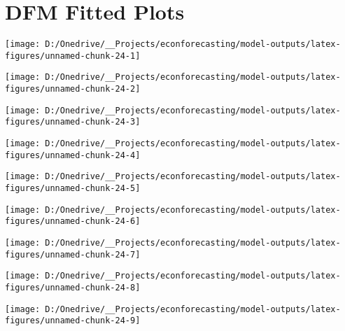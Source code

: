 \documentclass[11pt, letterpaper]{article}\usepackage[]{graphicx}\usepackage[]{color}
\begin{document}
\appendix
\appendixpage
\addappheadtotoc

\section{DFM Fitted Plots}


{\centering \texttt{[image: D:/Onedrive/\_\_Projects/econforecasting/model-outputs/latex-figures/unnamed-chunk-24-1]} 

}




{\centering \texttt{[image: D:/Onedrive/\_\_Projects/econforecasting/model-outputs/latex-figures/unnamed-chunk-24-2]} 

}




{\centering \texttt{[image: D:/Onedrive/\_\_Projects/econforecasting/model-outputs/latex-figures/unnamed-chunk-24-3]} 

}




{\centering \texttt{[image: D:/Onedrive/\_\_Projects/econforecasting/model-outputs/latex-figures/unnamed-chunk-24-4]} 

}




{\centering \texttt{[image: D:/Onedrive/\_\_Projects/econforecasting/model-outputs/latex-figures/unnamed-chunk-24-5]} 

}




{\centering \texttt{[image: D:/Onedrive/\_\_Projects/econforecasting/model-outputs/latex-figures/unnamed-chunk-24-6]} 

}




{\centering \texttt{[image: D:/Onedrive/\_\_Projects/econforecasting/model-outputs/latex-figures/unnamed-chunk-24-7]} 

}




{\centering \texttt{[image: D:/Onedrive/\_\_Projects/econforecasting/model-outputs/latex-figures/unnamed-chunk-24-8]} 

}




{\centering \texttt{[image: D:/Onedrive/\_\_Projects/econforecasting/model-outputs/latex-figures/unnamed-chunk-24-9]} 

}
\end{document}
